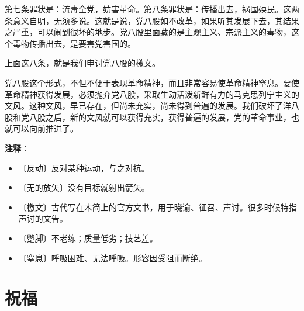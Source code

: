\documentclass[12pt,UTF-8,openany]{ctexbook}
\begin{document}
\begin{normalsize}
    第七条罪状是：流毒全党，妨害革命。第八条罪状是：传播出去，祸国殃民。这两条意义自明，无须多说。这就是说，党八股如不改革，如果听其发展下去，其结果之严重，可以闹到很坏的地步。党八股里面藏的是主观主义、宗派主义的毒物，这个毒物传播出去，是要害党害国的。
    
    上面这八条，就是我们申讨党八股的檄文。
    
    党八股这个形式，不但不便于表现革命精神，而且非常容易使革命精神窒息。要使革命精神获得发展，必须抛弃党八股，采取生动活泼新鲜有力的马克思列宁主义的文风。这种文风，早已存在，但尚未充实，尚未得到普遍的发展。我们破坏了洋八股和党八股之后，新的文风就可以获得充实，获得普遍的发展，党的革命事业，也就可以向前推进了。
    
\end{normalsize}


\newpage

\textbf{注释}：

\vspace{-1em}

\begin{itemize}
    \setlength\itemsep{-0.2em}
    \item 〔反动〕反对某种运动，与之对抗。
    \item 〔无的放矢〕没有目标就射出箭矢。
    \item 〔檄文〕古代写在木简上的官方文书，用于晓谕、征召、声讨。很多时候特指声讨的文告。
    \item 〔蹩脚〕不老练；质量低劣；技艺差。
    \item 〔窒息〕呼吸困难、无法呼吸。形容因受阻而断绝。
\end{itemize}

\chapter{祝福}
\end{document}
